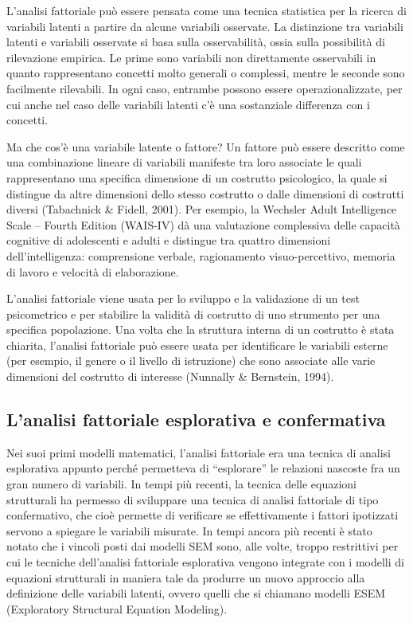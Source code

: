 L'analisi fattoriale può essere pensata come una tecnica statistica per la ricerca di variabili latenti a partire da alcune variabili osservate.  La distinzione tra variabili latenti e variabili osservate si basa sulla osservabilità, ossia sulla possibilità di rilevazione empirica. Le prime sono variabili non direttamente osservabili in quanto rappresentano concetti molto generali o complessi, mentre le seconde sono facilmente rilevabili. In ogni caso, entrambe possono essere operazionalizzate, per cui anche nel caso delle variabili latenti c'è una sostanziale differenza con i concetti. 

Ma che cos'è una variabile latente o fattore? Un fattore può essere descritto come una combinazione lineare di  variabili manifeste tra loro associate le quali rappresentano una specifica dimensione di un costrutto psicologico, la quale si distingue da altre dimensioni dello stesso costrutto o dalle dimensioni di costrutti diversi  (Tabachnick \&
Fidell, 2001). Per esempio, la Wechsler Adult Intelligence Scale – Fourth Edition (WAIS-IV) dà una valutazione complessiva delle capacità cognitive di adolescenti e adulti e distingue tra quattro dimensioni dell'intelligenza: comprensione verbale, ragionamento visuo-percettivo, memoria di lavoro e velocità di elaborazione. 

L'analisi fattoriale viene usata per lo sviluppo e la validazione di un test psicometrico e per stabilire la validità di costrutto di uno strumento per una specifica popolazione. Una volta che la struttura interna di un costrutto è stata chiarita, l'analisi fattoriale  può essere usata per identificare le variabili esterne (per esempio, il genere o il livello di istruzione) che sono associate alle varie dimensioni del costrutto di interesse (Nunnally \& Bernstein, 1994).


\subsection{L'analisi fattoriale esplorativa e confermativa}

Nei suoi primi modelli matematici, l’analisi fattoriale era una tecnica di analisi esplorativa appunto perché permetteva di ``esplorare'' le relazioni nascoste
fra un gran numero di variabili. 
In tempi più recenti, la tecnica delle equazioni strutturali ha permesso di sviluppare una tecnica di analisi fattoriale di tipo confermativo, che cioè permette di verificare se effettivamente i fattori ipotizzati servono a spiegare le variabili misurate. 
In tempi ancora più recenti è stato notato che i vincoli posti dai modelli SEM sono, alle volte, troppo restrittivi per cui le tecniche dell'analisi fattoriale esplorativa vengono integrate con i modelli di equazioni strutturali in maniera tale da produrre un nuovo approccio alla definizione delle variabili latenti, ovvero quelli che si chiamano modelli ESEM (Exploratory Structural Equation Modeling).
 

